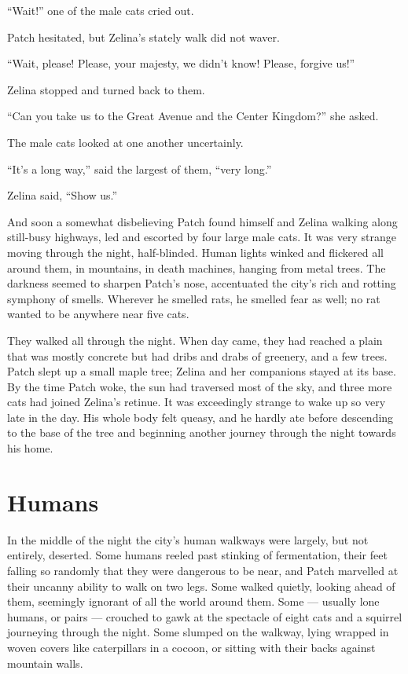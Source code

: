 \documentclass[12pt]{memoir}
\begin{document}
“Wait!” one of the male cats cried out.

Patch hesitated, but Zelina’s stately walk did not waver.

“Wait, please! Please, your majesty, we didn’t know! Please, forgive
us!”

Zelina stopped and turned back to them.

“Can you take us to the Great Avenue and the Center Kingdom?” she
asked.

The male cats looked at one another uncertainly.

“It’s a long way,” said the largest of them, “very long.”

Zelina said, “Show us.”

And soon a somewhat disbelieving Patch found himself and Zelina
walking along still-busy highways, led and escorted by four large male
cats. It was very strange moving through the night,
half-blinded. Human lights winked and flickered all around them, in
mountains, in death machines, hanging from metal trees. The darkness
seemed to sharpen Patch’s nose, accentuated the city’s rich and
rotting symphony of smells. Wherever he smelled rats, he smelled fear
as well; no rat wanted to be anywhere near five cats.

They walked all through the night. When day came, they had reached a
plain that was mostly concrete but had dribs and drabs of greenery,
and a few trees. Patch slept up a small maple tree; Zelina and her
companions stayed at its base. By the time Patch woke, the sun had
traversed most of the sky, and three more cats had joined Zelina’s
retinue. It was exceedingly strange to wake up so very late in the
day. His whole body felt queasy, and he hardly ate before descending
to the base of the tree and beginning another journey through the
night towards his home.


\section{Humans}

In the middle of the night the city’s human walkways were largely, but
not entirely, deserted. Some humans reeled past stinking of
fermentation, their feet falling so randomly that they were dangerous
to be near, and Patch marvelled at their uncanny ability to walk on
two legs. Some walked quietly, looking ahead of them, seemingly
ignorant of all the world around them. Some — usually lone humans, or
pairs — crouched to gawk at the spectacle of eight cats and a squirrel
journeying through the night. Some slumped on the walkway, lying
wrapped in woven covers like caterpillars in a cocoon, or sitting with
their backs against mountain walls.
\end{document}

